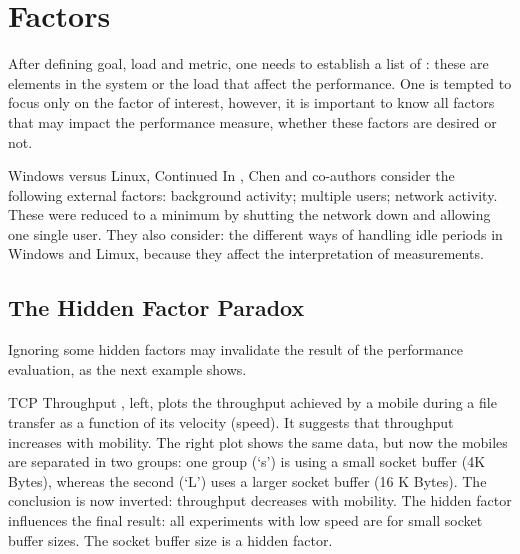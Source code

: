 \section{Factors}\label{sec-hf} After defining goal, load and metric,
one needs to establish a list of : these are elements in
the system or the load that affect the performance. One is tempted
to focus only on the factor of interest, however, it is important to
know all factors that may impact the performance measure, whether
these factors are desired or not.

\begin{ex}{Windows versus Linux, Continued} In
\cite{chen1995mpp}, Chen and co-authors consider the following
external factors: background activity; multiple users; network
activity. These were reduced to a minimum by shutting the network
down and allowing one single user. They also consider: the different
ways of handling idle periods in Windows and Limux, because they
affect the interpretation of measurements.
\end{ex}

\subsection{The Hidden Factor Paradox}
Ignoring some hidden factors may invalidate the result of the
performance evaluation, as the next example shows.
\begin{ex}{TCP Throughput}
, left, plots the throughput achieved by a
mobile during a file transfer as a function of its velocity (speed).
It suggests that throughput increases with mobility. The right plot
shows the same data, but now the mobiles are separated in two
groups: one group (`s') is using a small socket buffer (4K Bytes),
whereas the second (`L') uses a larger socket buffer (16 K Bytes).
The conclusion is now inverted: throughput decreases with mobility.
The hidden factor influences the final result: all experiments with
low speed are for small socket buffer sizes. The socket buffer size
is a hidden factor.

\begin{figure}[htbp]
   
\end{figure}
\label{ex-simpson-tcp}
\end{ex}

